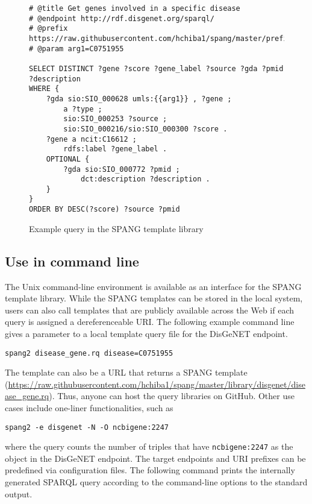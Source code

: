 \documentclass[runningheads]{llncs}
\begin{document}
\begin{figure}[!t]
\begin{scriptsize}
\begin{verbatim}
# @title Get genes involved in a specific disease
# @endpoint http://rdf.disgenet.org/sparql/
# @prefix https://raw.githubusercontent.com/hchiba1/spang/master/prefix/bio
# @param arg1=C0751955 

SELECT DISTINCT ?gene ?score ?gene_label ?source ?gda ?pmid ?description
WHERE {
    ?gda sio:SIO_000628 umls:{{arg1}} , ?gene ;
        a ?type ;
        sio:SIO_000253 ?source ;
        sio:SIO_000216/sio:SIO_000300 ?score .
    ?gene a ncit:C16612 ;
        rdfs:label ?gene_label .
    OPTIONAL {
        ?gda sio:SIO_000772 ?pmid ;
            dct:description ?description .
    }
}
ORDER BY DESC(?score) ?source ?pmid

\end{verbatim}
\end{scriptsize}
\caption{Example query in the SPANG template library}
\label{fig:example-sparql}
\end{figure}


\subsection{Use in command line}

The Unix command-line environment is available as an interface for the SPANG template library.
While the SPANG templates can be stored in the local system, users can also call templates that are publicly available across the Web if each query is assigned a dereferenceable URI.
The following example command line gives a parameter to a local template query file for the DisGeNET endpoint.

\texttt{spang2 disease\_gene.rq disease=C0751955}

\noindent The template can also be a URL that returns a SPANG template (\url{https://raw.githubusercontent.com/hchiba1/spang/master/library/disgenet/disease_gene.rq}). 
Thus, anyone can host the query libraries on GitHub.
Other use cases include one-liner functionalities, such as

\texttt{spang2 -e disgenet -N -O ncbigene:2247}

\noindent where the query counts the number of triples that have \texttt{ncbigene:2247} as the object in the DisGeNET endpoint. The target endpoints and URI prefixes can be predefined via configuration files. The following command prints the internally generated SPARQL query according to the command-line options to the standard output. 
\end{document}
